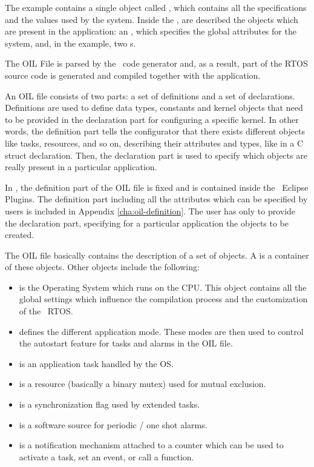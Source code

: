 The example contains a single object called , which
contains all the specifications and the values used by the system. Inside
the , are described the objects which are present in
the application: an , which specifies the global attributes
for the system, and, in the example, two s.

The OIL File is parsed by the \rtd\ code generator and, as a result,
part of the RTOS source code is generated and compiled together with
the application.

An OIL file consists of two parts: a set of definitions and a set of
declarations. Definitions are used to define data types, constants and
kernel objects that need to be provided in the declaration part for
configuring a specific kernel. In other words, the definition part
tells the configurator that there exists different objects like
tasks, resources, and so on, describing their attributes and types,
like in a C struct declaration. Then, the declaration part is used to
specify which objects are really present in a particular application.

In \rtd, the definition part of the OIL file is fixed and is
contained inside the \rtd\ Eclipse Plugins. The definition part
including all the attributes which can be specified by users is
included in Appendix \ref{cha:oil-definition}. The user has only to
provide the declaration part, specifying for a particular application
the objects to be created.

The OIL file basically contains the description of a set of objects. A
 is a container of these objects. Other objects include the following:
\begin{itemize}
\item {} is the Operating System which runs on the CPU. This
  object contains all the global settings which influence the
  compilation process and the customization of the \ee\ RTOS.
\item {} defines the different application mode.
  These modes are then used to control the autostart
  feature for tasks and alarms in the OIL file.
\item {} is an application task handled by the OS.
\item {} is a resource (basically a binary mutex) used
  for mutual exclusion.
\item {} is a synchronization flag used by extended tasks.
\item {} is a software source for periodic / one shot
  alarms.
\item {} is a notification mechanism attached to a counter
  which can be used to activate a task, set an event, or call a
  function.
\end{itemize}

